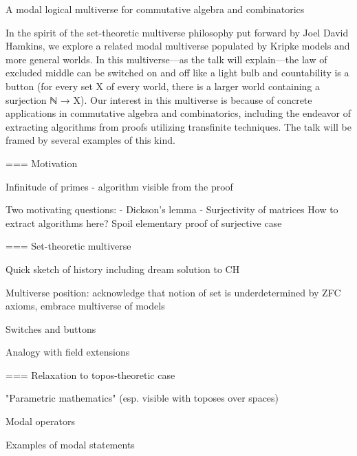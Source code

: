 A modal logical multiverse for commutative algebra and combinatorics

In the spirit of the set-theoretic multiverse philosophy put forward by
Joel David Hamkins, we explore a related modal multiverse populated by
Kripke models and more general worlds. In this
multiverse—as the talk will explain—the law of excluded middle can be
switched on and off like a light bulb and countability is a button (for
every set X of every world, there is a larger world containing a
surjection ℕ → X). Our interest in this multiverse is because of
concrete applications in commutative algebra and combinatorics,
including the endeavor of extracting algorithms from proofs utilizing
transfinite techniques. The talk will be framed by several examples of
this kind.


=== Motivation

Infinitude of primes
- algorithm visible from the proof

Two motivating questions:
- Dickson's lemma
- Surjectivity of matrices
How to extract algorithms here?
Spoil elementary proof of surjective case


=== Set-theoretic multiverse

Quick sketch of history including dream solution to CH

Multiverse position: acknowledge that notion of set is underdetermined by ZFC
axioms, embrace multiverse of models

Switches and buttons

Analogy with field extensions


=== Relaxation to topos-theoretic case

"Parametric mathematics" (esp. visible with toposes over spaces)

Modal operators

Examples of modal statements
